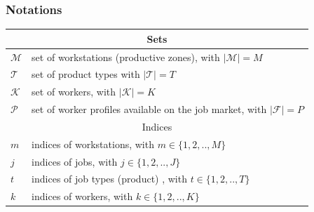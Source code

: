 \documentclass[review,12pt, 3p, times]{elsarticle}
\begin{document}
\subsubsection{Notations}
\begin{longtable}{p{} p{}}
	\hline
	\multicolumn{2}{c}{Sets }\\
	\hline
	$\mathcal{M}$ & set of workstations (productive zones), with $|\mathcal{M}|=M$                      \\
	$\mathcal{T}$ & set of  product types	with $|\mathcal{T}|=T$                                                                                                                                                                                           \\
	$\mathcal{K}$ & set of workers, with $|\mathcal{K}|=K$                                                                                                                                                                                                 \\
	$\mathcal{P}$ & set of worker profiles available on the job market, with $|\mathcal{F}|=P$                                                                                                                                                             \\	      		\hline
	\multicolumn{2}{c}{Indices }\\
	\hline
	$m$           & indices of workstations, with $m\in\{1,2,..,M\}$                                                                                                                                                                                       \\
	$j$           & indices of jobs, with $j\in\{1,2,..,J\}$                                                                                                                                                                                               \\
	$t$           & indices of job types (product) , with $t\in\{1,2,..,T\}$                                                                                                                                                                               \\
	$k$           & indices of workers, with $k\in\{1,2,..,K\}$                                                                                                                                                                                            \\

\end{longtable}
\end{document}

